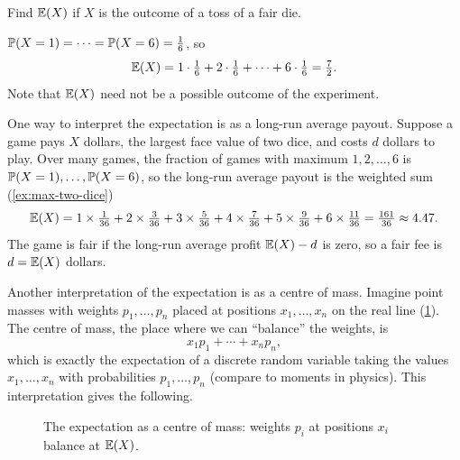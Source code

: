 \begin{example}\label{ex:expectation-fair-die}
Find $\operatorname{\mathbb{E}}(X)$ if $X$ is the outcome of a toss of a fair die.
\end{example}

\begin{solution}
$\mathbb{P}(X = 1) = \cdots = \mathbb{P}(X = 6) = \tfrac16$, so
\[
  \operatorname{\mathbb{E}}(X) = 1 \cdot \tfrac16 + 2 \cdot \tfrac16 + \cdots + 6 \cdot \tfrac16 = \tfrac72.
\]
Note that $\operatorname{\mathbb{E}}(X)$ need not be a possible outcome of the experiment.
\end{solution}

One way to interpret the expectation is as a long-run average payout. Suppose a game pays $X$ dollars, the largest face value of two dice, and costs $d$ dollars to play. Over many games, the fraction of games with maximum $1, 2, \ldots, 6$ is $\mathbb{P}(X = 1), \ldots, \mathbb{P}(X = 6)$, so the long-run average payout is the weighted sum (\cref{ex:max-two-dice})
\[
  \operatorname{\mathbb{E}}(X) = 1 \times \tfrac{1}{36} + 2 \times \tfrac{3}{36} + 3 \times \tfrac{5}{36} + 4 \times \tfrac{7}{36} + 5 \times \tfrac{9}{36} + 6 \times \tfrac{11}{36} = \tfrac{161}{36} \approx 4.47.
\]
The game is fair if the long-run average profit $\operatorname{\mathbb{E}}(X) - d$ is zero, so a fair fee is $d = \operatorname{\mathbb{E}}(X)$ dollars.

Another interpretation of the expectation is as a centre of mass. Imagine point masses with weights $p_1, \ldots, p_n$ placed at positions $x_1, \ldots, x_n$ on the real line (\cref{fig:centre-of-mass}). The centre of mass, the place where we can ``balance'' the weights, is
\[
  x_1 p_1 + \cdots + x_n p_n,
\]
which is exactly the expectation of a discrete random variable taking the values $x_1, \ldots, x_n$ with probabilities $p_1, \ldots, p_n$ (compare to moments in physics). This interpretation gives the following.

\begin{figure}[H]
\centering
{}
\caption{The expectation as a centre of mass: weights $p_i$ at positions $x_i$ balance at $\operatorname{\mathbb{E}}(X)$.}
\label{fig:centre-of-mass}
\end{figure}

